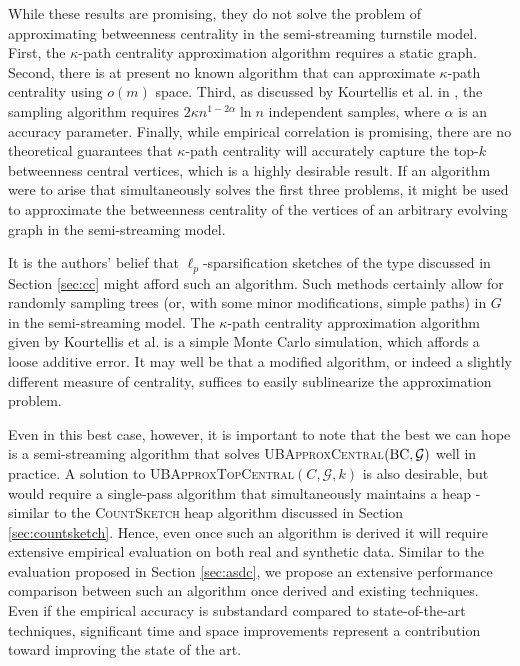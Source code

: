 \documentclass{report}
\newcommand{\algoname}[1]{\textnormal{\textsc{#1}}}
\begin{document}
While these results are promising, they do not solve the problem of approximating betweenness centrality in the semi-streaming turnstile model. 
First, the $\kappa$-path centrality approximation algorithm requires a static graph. 
Second, there is at present no known algorithm that can approximate $\kappa$-path centrality using $o(m)$ space. 
Third, as discussed by Kourtellis et al. in \cite{kourtellis2013identifying}, the sampling algorithm requires $2 \kappa n^{1-2\alpha} \ln n$ independent samples, where $\alpha$ is an accuracy parameter. 
Finally, while empirical correlation is promising, there are no theoretical guarantees that $\kappa$-path centrality will accurately capture the top-$k$ betweenness central vertices, which is a highly desirable result. 
If an algorithm were to arise that simultaneously solves the first three problems, it might be used to approximate the betweenness centrality of the vertices of an arbitrary evolving graph in the semi-streaming model. 

It is the authors' belief that $\ell_p$-sparsification sketches of the type discussed in Section \ref{sec:cc} might afford such an algorithm. 
Such methods certainly allow for randomly sampling trees (or, with some minor modifications, simple paths) in $G$ in the semi-streaming model.
The $\kappa$-path centrality approximation algorithm given by Kourtellis et al. is a simple Monte Carlo simulation, which affords a loose additive error.
It may well be that a modified algorithm, or indeed a slightly different measure of centrality, suffices to easily sublinearize the approximation problem.

Even in this best case, however, it is important to note that the best we can hope is a semi-streaming algorithm that solves \algoname{UBApproxCentral}$(\textnormal{BC}, \mathcal{G})$ well in practice. 
A solution to \algoname{UBApproxTopCentral}$(C, \mathcal{G}, k)$ is also desirable, but would require a single-pass algorithm that simultaneously maintains a heap - similar to the \algoname{CountSketch} heap algorithm discussed in Section \ref{sec:countsketch}. 
Hence, even once such an algorithm is derived it will require extensive empirical evaluation on both real and synthetic data.
Similar to the evaluation proposed in Section \ref{sec:asdc}, we propose an extensive performance comparison between such an algorithm once derived and existing techniques. 
Even if the empirical accuracy is substandard compared to state-of-the-art techniques, significant time and space improvements represent a contribution toward improving the state of the art. 
\end{document}
